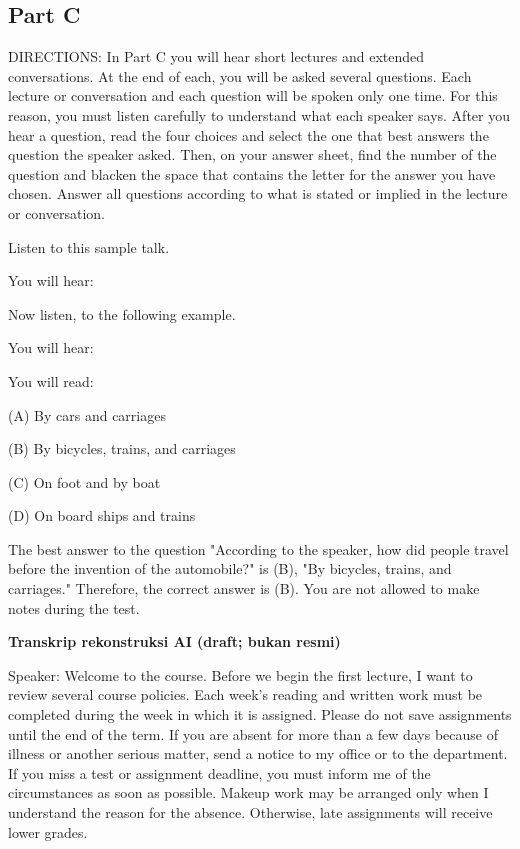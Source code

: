 \documentclass[12pt]{article}
\begin{document}
\subsection*{Part C}
DIRECTIONS: In Part C you will hear short lectures and extended conversations. At the end of each, you will be asked several questions. Each lecture or conversation and each question will be spoken only one time. For this reason, you must listen carefully to understand what each speaker says. After you hear a question, read the four choices and select the one that best answers the question the speaker asked. Then, on your answer sheet, find the number of the question and blacken the space that contains the letter for the answer you have chosen. Answer all questions according to what is stated or implied in the lecture or conversation.\par
\begin{exampleblock}
Listen to this sample talk.\par
You will hear:\par
Now listen, to the following example.\par
You will hear:\par
You will read:\par
(A) By cars and carriages\par
(B) By bicycles, trains, and carriages\par
(C) On foot and by boat\par
(D) On board ships and trains\par
The best answer to the question "According to the speaker, how did people travel before the invention of the automobile?" is (B), "By bicycles, trains, and carriages." Therefore, the correct answer is (B). You are not allowed to make notes during the test.\par
\end{exampleblock}
\begin{exampleblock}
\textbf{Transkrip rekonstruksi AI (draft; bukan resmi)}\par
Speaker: Welcome to the course. Before we begin the first lecture, I want to review several course policies. Each week's reading and written work must be completed during the week in which it is assigned. Please do not save assignments until the end of the term. If you are absent for more than a few days because of illness or another serious matter, send a notice to my office or to the department. If you miss a test or assignment deadline, you must inform me of the circumstances as soon as possible. Makeup work may be arranged only when I understand the reason for the absence. Otherwise, late assignments will receive lower grades.\par
\end{exampleblock}
\end{document}
